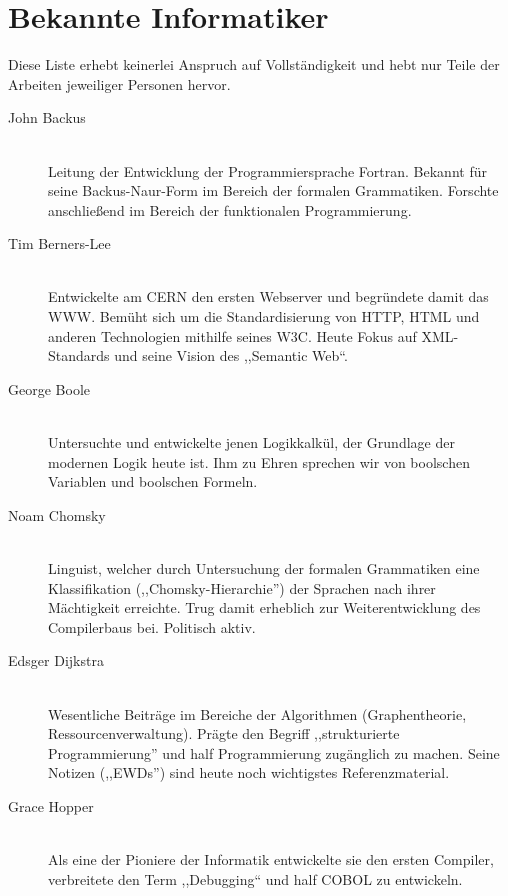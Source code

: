 \chapter{Bekannte Informatiker}
%
Diese Liste erhebt keinerlei Anspruch auf Vollständigkeit und hebt nur Teile der Arbeiten jeweiliger Personen hervor.
%
\begin{description}
  \item[John Backus ] \hfill{} \\
    Leitung der Entwicklung der Programmiersprache Fortran.
    Bekannt für seine Backus-Naur-Form im Bereich der formalen Grammatiken.
    Forschte anschließend im Bereich der funktionalen Programmierung.

   \item[Tim Berners-Lee ] \hfill{} \\
    Entwickelte am CERN den ersten Webserver und begründete damit das WWW.
    Bemüht sich um die Standardisierung von HTTP, HTML und anderen Technologien mithilfe seines W3C.
    Heute Fokus auf XML-Standards und seine Vision des ,,Semantic Web``.

  \item[George Boole ] \hfill{} \\
    Untersuchte und entwickelte jenen Logikkalkül, der Grundlage der modernen Logik heute ist.
    Ihm zu Ehren sprechen wir von boolschen Variablen und boolschen Formeln.

  \item[Noam Chomsky ] \hfill{} \\
    Linguist, welcher durch Untersuchung der formalen Grammatiken eine Klassifikation (,,Chomsky-Hierarchie'') der Sprachen nach ihrer Mächtigkeit erreichte.
    Trug damit erheblich zur Weiterentwicklung des Compilerbaus bei.
    Politisch aktiv.

  \item[Edsger Dijkstra ] \hfill{} \\
    Wesentliche Beiträge im Bereiche der Algorithmen (Graphentheorie, Ressourcenverwaltung).
    Prägte den Begriff ,,strukturierte Programmierung'' und half Programmierung zugänglich zu machen.
    Seine Notizen (,,EWDs'') sind heute noch wichtigstes Referenzmaterial.

  \item[Grace Hopper ] \hfill{} \\
    Als eine der Pioniere der Informatik entwickelte sie den ersten Compiler, verbreitete den Term ,,Debugging`` und half COBOL zu entwickeln.


\end{description}
